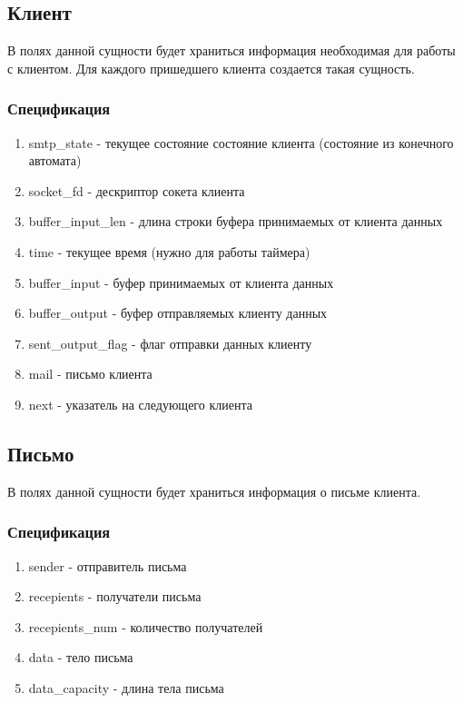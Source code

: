 \documentclass[a4paper,12pt]{report}
\begin{document}
\subsection{Клиент}

В полях данной сущности будет храниться информация необходимая для работы с клиентом. Для каждого пришедшего клиента создается такая сущность.

\subsubsection{Спецификация}

\begin{enumerate}
	\item smtp\_state - текущее состояние состояние клиента (состояние из конечного автомата)
	\item socket\_fd - дескриптор сокета клиента
	\item buffer\_input\_len - длина строки буфера принимаемых от клиента данных
	\item time - текущее время (нужно для работы таймера)
	\item buffer\_input - буфер принимаемых от клиента данных
	\item buffer\_output - буфер отправляемых  клиенту данных
	\item sent\_output\_flag - флаг отправки данных клиенту
	\item mail - письмо клиента
	\item next - указатель на следующего клиента
\end{enumerate}

\subsection{Письмо}

В полях данной сущности будет храниться информация о письме клиента.

\subsubsection{Спецификация}

\begin{enumerate}
	\item sender - отправитель письма
	\item recepients - получатели письма
	\item recepients\_num - количество получателей
	\item data - тело письма
	\item data\_capacity - длина тела письма
	
\end{enumerate}
\end{document}
